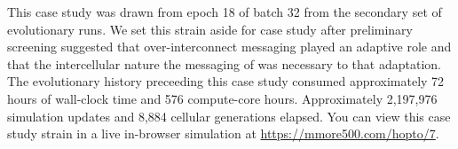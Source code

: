 This case study was drawn from epoch 18 of batch 32 from the secondary set of evolutionary runs.
We set this strain aside for case study after preliminary screening suggested that over-interconnect messaging played an adaptive role and that the intercellular nature the messaging of was necessary to that adaptation.
The evolutionary history preceeding this case study consumed approximately 72 hours of wall-clock time and 576 compute-core hours.
Approximately 2,197,976 simulation updates and 8,884 cellular generations elapsed.
You can view this case study strain in a live in-browser simulation at \url{https://mmore500.com/hopto/7}.
